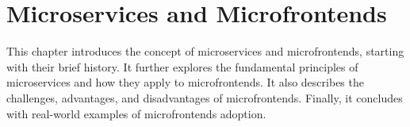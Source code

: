 \chapter{Microservices and Microfrontends}
\label{chap:MicroservicesAndMicrofrontends} 
This chapter introduces the concept of microservices and microfrontends, starting with their brief history. It further explores the fundamental principles of microservices and how they apply to microfrontends. It also describes the challenges, advantages, and disadvantages of microfrontends. Finally, it concludes with real-world examples of microfrontends adoption.







